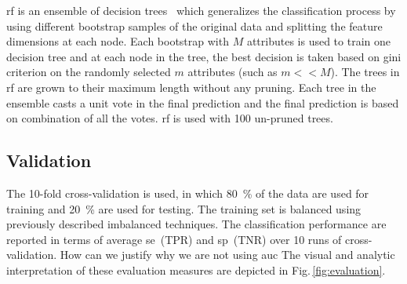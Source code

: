 \Ac{rf} is an ensemble of decision trees~\cite{breiman2001random} which generalizes the classification process by using different bootstrap samples of the original data and splitting the feature dimensions at each node.
Each bootstrap with $M$ attributes is used to train one decision tree and at each node in the tree, the best decision is taken based on gini criterion on the randomly selected $m$ attributes (such as $m<<M$). 
The trees in \ac{rf} are grown to their maximum length without any pruning.
Each tree in the ensemble casts a unit vote in the final prediction and the final prediction is based on combination of all the votes. 
\Ac{rf} is used with 100 un-pruned trees.

\subsection{Validation}

The 10-fold cross-validation is used, in which \SI{80}{\percent} of the data are used for training and \SI{20}{\percent} are used for testing. 
The training set is balanced using previously described imbalanced techniques. 
The classification performance are reported in terms of average \ac{se}~(TPR) and \ac{sp}~(TNR) over 10 runs of cross-validation. 
{\color{red} How can we justify why we are not using auc}
The visual and analytic interpretation of these evaluation measures are depicted in Fig.\,\ref{fig:evaluation}.

